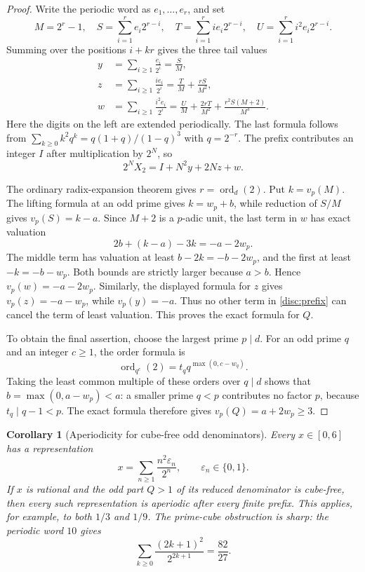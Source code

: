 \documentclass[11pt,a4paper]{article}
\newtheorem{corollary}[theorem]{Corollary}
\theoremstyle{definition}
\theoremstyle{remark}
\numberwithin{equation}{section}
\begin{document}
\begin{proof}
Write the periodic word as $e_1,\ldots,e_r$, and set
\[
 M=2^r-1,\quad
 S=\sum_{i=1}^r e_i2^{r-i},\quad
 T=\sum_{i=1}^r i e_i2^{r-i},\quad
 U=\sum_{i=1}^r i^2 e_i2^{r-i}.
\]
Summing over the positions $i+kr$ gives the three tail values
\begin{align*}
 y&=\sum_{i\ge1}\frac{e_i}{2^i}=\frac{S}{M},\\
 z&=\sum_{i\ge1}\frac{i e_i}{2^i}=\frac{T}{M}+\frac{rS}{M^2},\\
 w&=\sum_{i\ge1}\frac{i^2e_i}{2^i}
   =\frac{U}{M}+\frac{2rT}{M^2}
      +\frac{r^2S(M+2)}{M^3}.
\end{align*}
Here the digits on the left are extended periodically.  The last
formula follows from
$\sum_{k\ge0}k^2q^k=q(1+q)/(1-q)^3$ with $q=2^{-r}$.
The prefix contributes an integer $I$ after multiplication by $2^N$,
so
\begin{equation}\label{disc:prefix}
 2^NX_2=I+N^2y+2Nz+w.
\end{equation}

The ordinary radix-expansion theorem gives $r=\operatorname{ord}_d(2)$.
Put $k=v_p(M)$.  The lifting formula at an odd prime gives
$k=w_p+b$, while reduction of $S/M$ gives $v_p(S)=k-a$.
Since $M+2$ is a $p$-adic unit, the last term in $w$ has exact valuation
\[
 2b+(k-a)-3k=-a-2w_p.
\]
The middle term has valuation at least
$b-2k=-b-2w_p$, and the first at least $-k=-b-w_p$.
Both bounds are strictly larger because $a>b$.  Hence
$v_p(w)=-a-2w_p$.  Similarly, the displayed formula for $z$ gives
$v_p(z)=-a-w_p$, while $v_p(y)=-a$.  Thus no other term in
\eqref{disc:prefix} can cancel the term of least valuation.  This proves
the exact formula for $Q$.

To obtain the final assertion, choose the largest prime $p\mid d$.
For an odd prime $q$ and an integer $c\ge1$, the order formula is
\[
 \operatorname{ord}_{q^c}(2)
 =t_q q^{\max(0,c-w_q)}.
\]
Taking the least common multiple of these orders over $q\mid d$ shows
that $b=\max(0,a-w_p)<a$: a smaller prime $q<p$ contributes no factor
$p$, because $t_q\mid q-1<p$.  The exact formula therefore gives
$v_p(Q)=a+2w_p\ge3$.
\end{proof}

\begin{corollary}[Aperiodicity for cube-free odd denominators]
\label{disc:cubefree}
Every $x\in[0,6]$ has a representation
\[
 x=\sum_{n\ge1}\frac{n^2\varepsilon_n}{2^n},
 \qquad \varepsilon_n\in\{0,1\}.
\]
If $x$ is rational and the odd part $Q>1$ of its reduced denominator
is cube-free, then every such representation is aperiodic after every
finite prefix.  This applies, for example, to both $1/3$ and $1/9$.
The prime-cube obstruction is sharp: the periodic word $10$ gives
\[
 \sum_{k\ge0}\frac{(2k+1)^2}{2^{2k+1}}=\frac{82}{27}.
\]
\end{corollary}
\end{document}
